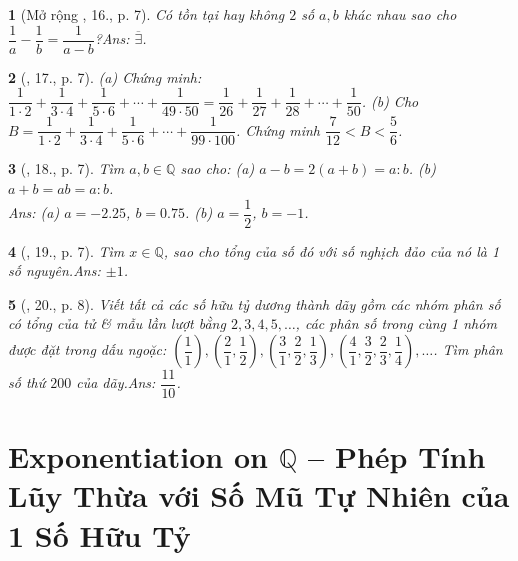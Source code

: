 \documentclass{article}
\newtheorem{baitoan}{}
\begin{document}
\begin{baitoan}[Mở rộng \cite{Binh_Toan_7_tap_1}, 16., p. 7]
	Có tồn tại hay không $2$ số $a,b$ khác nhau sao cho $\dfrac{1}{a} - \dfrac{1}{b} = \dfrac{1}{a - b}$?\hfill{\sf Ans: $\overline{\exists}$.}
\end{baitoan}

\begin{baitoan}[\cite{Binh_Toan_7_tap_1}, 17., p. 7]
	(a) Chứng minh: $\dfrac{1}{1\cdot 2} + \dfrac{1}{3\cdot 4} + \dfrac{1}{5\cdot 6} + \cdots + \dfrac{1}{49\cdot 50} = \dfrac{1}{26} + \dfrac{1}{27} + \dfrac{1}{28} + \cdots + \dfrac{1}{50}$. (b) Cho $B = \dfrac{1}{1\cdot 2} + \dfrac{1}{3\cdot 4} + \dfrac{1}{5\cdot 6} + \cdots + \dfrac{1}{99\cdot 100}$. Chứng minh $\dfrac{7}{12} < B < \dfrac{5}{6}$.		
\end{baitoan}

\begin{baitoan}[\cite{Binh_Toan_7_tap_1}, 18., p. 7]
	Tìm $a,b\in\mathbb{Q}$ sao cho: (a) $a - b = 2(a + b) = a:b$. (b) $a + b = ab = a:b$.
	\\\mbox{}\hfill{\sf Ans: (a) $a = -2.25$, $b = 0.75$. (b) $a = \dfrac{1}{2}$, $b = -1$.}
\end{baitoan}

\begin{baitoan}[\cite{Binh_Toan_7_tap_1}, 19., p. 7]
	Tìm $x\in\mathbb{Q}$, sao cho tổng của số đó với số nghịch đảo của nó là 1 số nguyên.\hfill{\sf Ans: $\pm 1$.}
\end{baitoan}

\begin{baitoan}[\cite{Binh_Toan_7_tap_1}, 20., p. 8]
	Viết tất cả các số hữu tỷ dương  thành dãy gồm các nhóm phân số có tổng của tử \& mẫu lần lượt bằng $2,3,4,5,\ldots$, các phân số trong cùng 1 nhóm được đặt trong dấu ngoặc: $\left(\dfrac{1}{1}\right),\left(\dfrac{2}{1},\dfrac{1}{2}\right),\left(\dfrac{3}{1},\dfrac{2}{2},\dfrac{1}{3}\right),\left(\dfrac{4}{1},\dfrac{3}{2},\dfrac{2}{3},\dfrac{1}{4}\right),\ldots$. Tìm phân số thứ $200$ của dãy.\hfill{\sf Ans: $\dfrac{11}{10}$.}
\end{baitoan}


\section{Exponentiation on $\mathbb{Q}$ -- Phép Tính Lũy Thừa với Số Mũ Tự Nhiên của 1 Số Hữu Tỷ}
\end{document}

